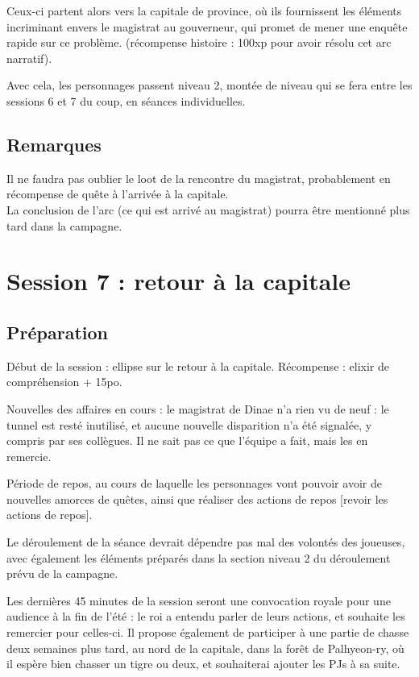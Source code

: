 \documentclass[10pt,a4paper]{book}
\begin{document}
Ceux-ci partent alors vers la capitale de province, où ils fournissent les éléments incriminant envers le magistrat au gouverneur, qui promet de mener une enquête rapide sur ce problème. (récompense histoire : 100xp pour avoir résolu cet arc narratif).

Avec cela, les personnages passent niveau 2, montée de niveau qui se fera entre les sessions 6 et 7 du coup, en séances individuelles.
\subsection{Remarques}
Il ne faudra pas oublier le loot de la rencontre du magistrat, probablement en récompense de quête à l'arrivée à la capitale.\\
La conclusion de l'arc (ce qui est arrivé au magistrat) pourra être mentionné plus tard dans la campagne.
\section{Session 7 : retour à la capitale}
\subsection{Préparation}
Début de la session : ellipse sur le retour à la capitale. Récompense : elixir de compréhension + 15po.

Nouvelles des affaires en cours : le magistrat de Dinae n'a rien vu de neuf : le tunnel est resté inutilisé, et aucune nouvelle disparition n'a été signalée, y compris par ses collègues. Il ne sait pas ce que l'équipe a fait, mais les en remercie.

Période de repos, au cours de laquelle les personnages vont pouvoir avoir de nouvelles amorces de quêtes, ainsi que réaliser des actions de repos [revoir les actions de repos].

Le déroulement de la séance devrait dépendre pas mal des volontés des joueuses, avec également les éléments préparés dans la section niveau 2 du déroulement prévu de la campagne.

Les dernières 45 minutes de la session seront une convocation royale pour une audience à la fin de l'été : le roi a entendu parler de leurs actions, et souhaite les remercier pour celles-ci. Il propose également de participer à une partie de chasse deux semaines plus tard, au nord de la capitale, dans la forêt de Palhyeon-ry, où il espère bien chasser un tigre ou deux, et souhaiterai ajouter les PJs à sa suite.
\end{document}
